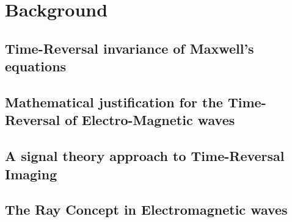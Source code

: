 
\chapter{Background}\label{chapter:background}

\section{Time-Reversal invariance of Maxwell's equations}

\section{Mathematical justification for the Time-Reversal of Electro-Magnetic waves}

\section{A signal theory approach to Time-Reversal Imaging}

\section{The Ray Concept in Electromagnetic waves}

